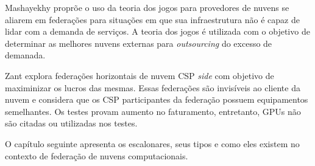 Mashayekhy\cite{6853386} proprõe o uso da teoria dos jogos para provedores de nuvens se aliarem em federações para situações em que sua infraestrutura não é capaz de lidar com a demanda de serviços. A teoria dos jogos é utilizada com o objetivo de determinar as melhores nuvens externas para \textit{outsourcing} do excesso de demanada.

Zant\cite{6814036} explora federações horizontais de nuvem \acrfull{CSP} \textit{side} com objetivo de maximinizar os lucros das mesmas. Essas federações são invisíveis ao cliente da nuvem e considera que os \acrshort{CSP} participantes da federação possuem equipamentos semelhantes. Os testes provam aumento no faturamento, entretanto, \acrshort{GPU}s não são citadas ou utilizadas nos testes.


O capítulo seguinte apresenta os escalonares, seus tipos e como eles existem no contexto de federação de nuvens computacionais.

